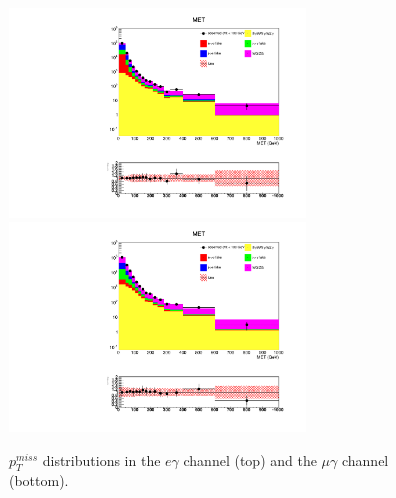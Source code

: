 \documentclass[thesis.tex]{subfiles}
\renewcommand\_{\textunderscore\allowbreak}
\begin{document}
\begin{figure}
  \centering
    \includegraphics[width=0.7\textwidth]{Figures/VALID_egamma_2016ReMiniAOD_met.pdf} \\
    \includegraphics[width=0.7\textwidth]{Figures/VALID_mg_2016ReMiniAOD_met.pdf} \\
  \caption{$p_T^{miss}$ distributions in the $e\gamma$ channel (top) and the $\mu\gamma$ channel (bottom).}
    \label{fig:metvalidation}
\end{figure}
\end{document}
